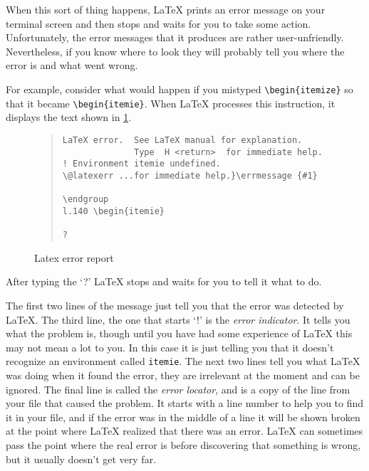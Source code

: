 When this sort of thing happens, \LaTeX{} prints an error message on your
terminal screen and then stops and waits for you to take some action.
Unfortunately, the error messages that it produces are rather
user-unfriendly.
Nevertheless, if you know where to look they
will probably tell you where the error is and what went wrong.
 
For example,
consider what would happen if you mistyped \verb+\begin{itemize}+ so
that it became \verb+\begin{itemie}+.
When \LaTeX{} processes this instruction, it
displays the text shown in \ref{fig:error}.
\begin{figure}
\begin{quote}\footnotesize\begin{verbatim}
LaTeX error.  See LaTeX manual for explanation.
              Type  H <return>  for immediate help.
! Environment itemie undefined.
\@latexerr ...for immediate help.}\errmessage {#1}
                                                  \endgroup
l.140 \begin{itemie}
 
?
\end{verbatim}\end{quote}
\vspace{1em}
\caption{Latex error report}
\label{fig:error}
\end{figure}
After typing the `?' \LaTeX{} stops and waits for you to tell it
what to do.
 
The first two lines of the message just tell you that the error was
detected by \LaTeX{}.
The third line, the one that starts `!' is the {\em error indicator}.
It tells you what the problem is, though until you have had some
experience of \LaTeX{} this may not mean a lot to you.
In this case it is just telling you
that it doesn't recognize an environment called {\tt itemie}.
The next two lines tell you what \LaTeX{} was doing when it found the
error, they are irrelevant at the moment and can be ignored.
The final line is called the {\em error locator}, and is
a copy of the line from your file that caused the problem.
It starts with a line number to help you to find it in your file, and
if the error was in the middle of a line it will be shown
broken at the point where \LaTeX{} realized that there was an error.
\LaTeX{} can sometimes pass the point where the real error is before
discovering that something is wrong, but it usually doesn't get very far.
 
